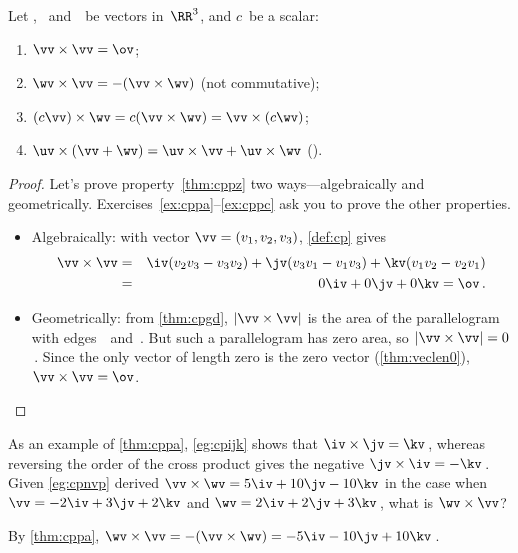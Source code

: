 \begin{theorem} \label{thm:cpp}
Let \uv, \vv\ and~\wv\ be vectors in~\(\RR^3\), and \(c\)~be a scalar:
\begin{enumerate}
\item\label{thm:cppz} \(\vv\times\vv=\ov\);
\item\label{thm:cppa} \(\wv\times\vv=-(\vv\times\wv)\) \quad(not commutative);
\item\label{thm:cppb} \((c\vv)\times\wv=c(\vv\times\wv)=\vv\times(c\wv)\);
\item\label{thm:cppc} \(\uv\times(\vv+\wv)=\uv\times\vv+\uv\times\wv\) \quad().
\end{enumerate}
\end{theorem}


\begin{proof} 
Let's prove property~\ref{thm:cppz} two ways---algebraically and geometrically.  Exercises~\ref{ex:cppa}--\ref{ex:cppc} ask you to prove the other properties.
\begin{itemize}
\item Algebraically:  with vector \(\vv=(v_1,v_2,v_3)\),  \autoref{def:cp} gives
\begin{eqnarray*}
\vv\times\vv
&=&\iv(v_2v_3-v_3v_2)
+\jv(v_3v_1-v_1v_3)
+\kv(v_1v_2-v_2v_1)
\\&=&0\iv+0\jv+0\kv=\ov\,.
\end{eqnarray*}
\item Geometrically: 
from \autoref{thm:cpgd}, \(|\vv\times\vv|\) is the area of the parallelogram with edges~\vv\ and~\vv.
But such a parallelogram has zero area, so \(|\vv\times\vv|=0\)\,.
Since the only vector of length zero is the zero vector (\autoref{thm:veclen0}), \(\vv\times\vv=\ov\).
\end{itemize}
\end{proof}





\begin{example} \label{eg:}
As an example of \autoref{thm:cppa}, \autoref{eg:cpijk} shows that \(\iv\times\jv=\kv\)\,, whereas reversing the order of the cross product gives the negative \(\jv\times\iv=-\kv\)\,.  
Given \autoref{eg:cpnvp} derived \(\vv\times\wv=5\iv+10\jv-10\kv\) in the case when \(\vv=-2\iv+3\jv+2\kv\) and \(\wv=2\iv+2\jv+3\kv\)\,, what is \(\wv\times\vv\)?
\begin{solution} 
By \autoref{thm:cppa},
\(\wv\times\vv=-(\vv\times\wv)=-5\iv-10\jv+10\kv\)\,.
\end{solution}
\end{example}


